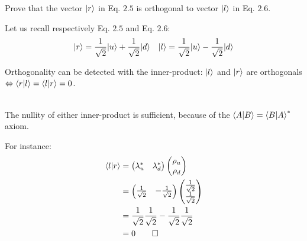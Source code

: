\documentclass[solutions.tex]{subfiles}
\begin{document}
\maketitle
\begin{exercise}
Prove that the vector $|r\rangle$ in Eq. $2.5$ is orthogonal to vector
$|l\rangle$ in Eq. $2.6$.
\end{exercise}
\hrr

Let us recall respectively Eq. $2.5$ and Eq. $2.6$:
\begin{align*}
|r\rangle &= \frac{1}{\sqrt2}|u\rangle + \frac{1}{\sqrt2}|d\rangle &
|l\rangle &= \frac{1}{\sqrt2}|u\rangle - \frac{1}{\sqrt2}|d\rangle \\
\end{align*}

Orthogonality can be detected with the inner-product: $|l\rangle$
and $|r\rangle$ are orthogonals $\Leftrightarrow \left\langle r \middle| l \right\rangle =
\left\langle l \middle| r \right\rangle = 0$.

\begin{remark}\ \\
The nullity of either inner-product is sufficient, because
of the $\left\langle A \middle| B \right\rangle = \left\langle B \middle| A \right\rangle^*$ axiom.
\end{remark}

For instance:
\begin{align*}
\left\langle l \middle| r \right\rangle & =
\begin{pmatrix}
	\lambda_u^* & \lambda_d^* \\
\end{pmatrix}
\begin{pmatrix}
	\rho_u \\
	\rho_d \\
\end{pmatrix} \\
~ & = \begin{pmatrix}
	\frac1{\sqrt2} & -\frac1{\sqrt2} \\
\end{pmatrix}
\begin{pmatrix}
	\frac1{\sqrt2} \\
	\frac1{\sqrt2} \\
\end{pmatrix} \\
~ & = \frac1{\sqrt2}\frac1{\sqrt2}-\frac1{\sqrt2}\frac1{\sqrt2} \\
~ & = 0 \qed\\
\end{align*}
\end{document}
